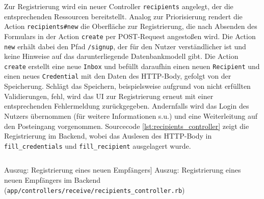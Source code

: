 Zur Registrierung wird ein neuer Controller \texttt{recipients} angelegt, der die entsprechenden Ressourcen bereitstellt. Analog zur Priorisierung rendert die Action \texttt{recipients\#new} die Oberfläche zur Registrierung, die nach Absenden des Formulars in der Action \texttt{create} per POST-Request angestoßen wird. Die Action \texttt{new} erhält dabei den Pfad \texttt{/signup}, der für den Nutzer verständlicher ist und keine Hinweise auf das darunterliegende Datenbankmodell gibt. Die Action \texttt{create} erstellt eine neue \texttt{Inbox} und befüllt daraufhin einen neuen \texttt{Recipient} und einen neues \texttt{Credential} mit den Daten des HTTP-Body, gefolgt von der Speicherung. Schlägt das Speichern, beispielsweise aufgrund von nicht erfüllten Validierungen, fehl, wird das UI zur Registrierung erneut mit einer entsprechenden Fehlermeldung zurückgegeben. Andernfalls wird das Login des Nutzers übernommen (für weitere Informationen s.u.) und eine Weiterleitung auf den Posteingang vorgenommen. Sourcecode \ref{lst:recipients_controller} zeigt die Registrierung im Backend, wobei das Auslesen des HTTP-Body in \texttt{fill\_credentials} und \texttt{fill\_recipient} ausgelagert wurde.

\begin{listing}[!ht]
\inputminted[firstline=9, lastline=23, linenos]{ruby}{Listings/Pkg3/recipients_controller.rb}

\caption
    [Auszug: Registrierung eines neuen Empfängers]
    {Auszug: Registrierung eines neuen Empfängers im Backend (\texttt{app/controllers/receive/recipients\_controller.rb})}

\label{lst:recipients_controller}
\end{listing}

